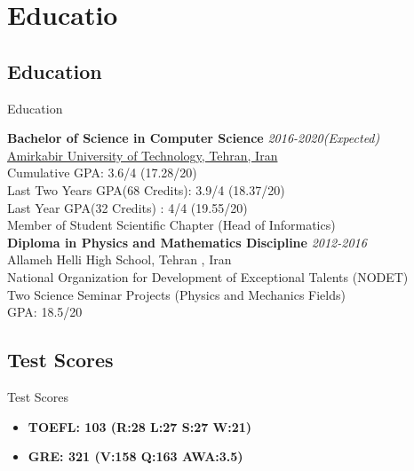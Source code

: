 \documentclass{resume} %
\begin{document}
	
	\chapter{Educatio}
	\section{Education}
	\begin{rSection}{Education}
		
		{\bf Bachelor of Science in Computer Science} \hfill {\em 2016-2020(Expected)} \\ 
		\href{https://www.topuniversities.com/universities/amirkabir-university-technology}{Amirkabir University of Technology, Tehran, Iran}\\
		Cumulative GPA: 3.6/4 (17.28/20)\\
		Last Two Years GPA(68 Credits): 3.9/4 (18.37/20)\\
		Last Year GPA(32 Credits) : 4/4 (19.55/20)\\
		Member of Student Scientific Chapter (Head of Informatics) \\
		
		{\bf Diploma in Physics and Mathematics Discipline} \hfill {\em 2012-2016}\\ 
		Allameh Helli High School, Tehran , Iran\\
		National Organization for Development of Exceptional Talents (NODET)\\
		Two Science Seminar Projects (Physics and Mechanics Fields)\\
		GPA: 18.5/20\\
		
	\end{rSection}
	\section{Test Scores}
	\begin{rSection}{Test Scores}
		\begin{itemize}{\bfseries}
			\item {\bfseries TOEFL: 103 (R:28 L:27 S:27 W:21)}
			\item {\bfseries GRE: 321 (V:158 Q:163 AWA:3.5)}
		\end{itemize}
		
	\end{rSection}
	
\end{document}
